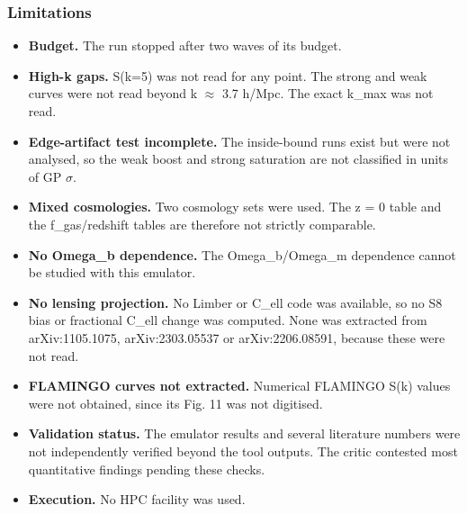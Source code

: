 \documentclass[11pt,a4paper]{article}
\begin{document}
\subsubsection*{Limitations}
\begin{itemize}
  \item \textbf{Budget.} The run stopped after two waves of its budget.
  \item \textbf{High-k gaps.} S(k=5) was not read for any point. The strong and weak curves were not read beyond k $\approx$ 3.7 h/Mpc. The exact k\_max was not read.
  \item \textbf{Edge-artifact test incomplete.} The inside-bound runs exist but were not analysed, so the weak boost and strong saturation are not classified in units of GP $\sigma$.
  \item \textbf{Mixed cosmologies.} Two cosmology sets were used. The z = 0 table and the f\_gas/redshift tables are therefore not strictly comparable.
  \item \textbf{No Omega\_b dependence.} The Omega\_b/Omega\_m dependence cannot be studied with this emulator.
  \item \textbf{No lensing projection.} No Limber or C\_ell code was available, so no S8 bias or fractional C\_ell change was computed. None was extracted from arXiv:1105.1075, arXiv:2303.05537 or arXiv:2206.08591, because these were not read.
  \item \textbf{FLAMINGO curves not extracted.} Numerical FLAMINGO S(k) values were not obtained, since its Fig. 11 was not digitised.
  \item \textbf{Validation status.} The emulator results and several literature numbers were not independently verified beyond the tool outputs. The critic contested most quantitative findings pending these checks.
  \item \textbf{Execution.} No HPC facility was used.
\end{itemize}
\end{document}
